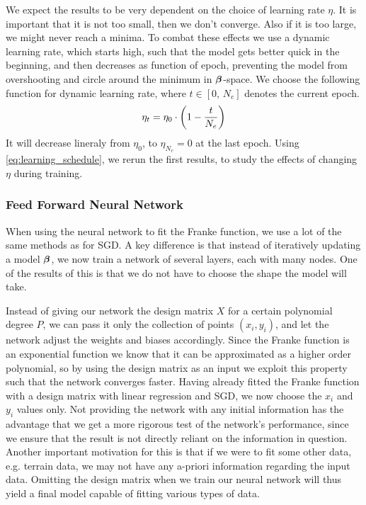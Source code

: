 \documentclass[12pt]{extarticle}
\begin{document}
We expect the results to be very dependent on the choice of learning rate $\eta$. It is important that it is not too small, then we don't converge. Also if it is too large, we might never reach a minima. To combat these effects we use a dynamic learning rate, which starts high, such that the model gets better quick in the beginning, and then decreases as function of epoch, preventing the model from overshooting and circle around the minimum in $\boldsymbol{\beta}$-space. We choose the following function for dynamic learning rate, where $t\in[0, \, N_e]$ denotes the current epoch.
\begin{align} \label{eq:learning_schedule}
	\eta_t = \eta_0 \cdot \left( 1 - \frac{t}{N_e} \right)
\end{align}
It will decrease lineraly from $\eta_0$, to $\eta_{N_e}=0$ at the last epoch.
Using \eqref{eq:learning_schedule}, we rerun the first results, to study the effects of changing $\eta$ during training.

\subsubsection{Feed Forward Neural Network}
When using the neural network to fit the Franke function, we use a lot of the same methods as for SGD. A key difference is that instead of iteratively updating a model $\boldsymbol{\beta}$, we now train a network of several layers, each with many nodes. One of the results of this is that we do not have to choose the shape the model will take.

Instead of giving our network the design matrix $X$ for a certain polynomial degree $P$, we can pass it only the collection of points $(x_i, y_i)$, and let the network adjust the weights and biases accordingly. Since the Franke function is an exponential function we know that it can be approximated as a higher order polynomial, so by using the design matrix as an input we exploit this property such that the network converges faster. Having already fitted the Franke function with a design matrix with linear regression and SGD, we now choose the $x_i$ and $y_i$ values only. Not providing the network with any initial information has the advantage that we get a more rigorous test of the network's performance, since we ensure that the result is not directly reliant on the information in question. Another important motivation for this is that if we were to fit some other data, e.g. terrain data, we may not have any a-priori information regarding the input data. Omitting the design matrix when we train our neural network will thus yield a final model capable of fitting various types of data.
\end{document}
